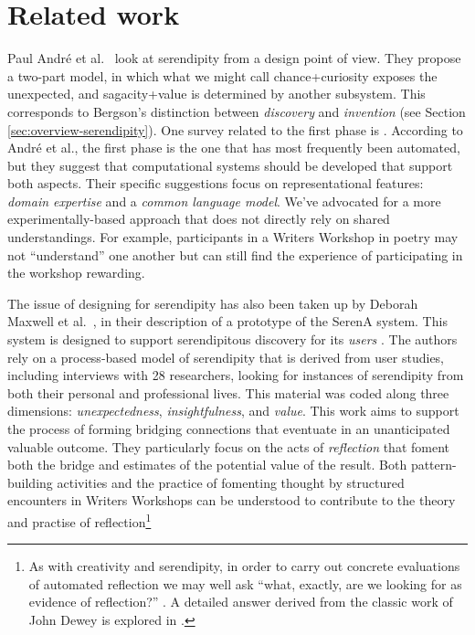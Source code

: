 \section{Related work} \label{sec:related}

Paul Andr{\'e} et al.~\cite{andre2009discovery} look at serendipity
from a design point of view.  They propose a two-part model, in which
what we might call chance+curiosity exposes the unexpected, and
sagacity+value is determined by another subsystem.  This corresponds
to Bergson's distinction between \emph{discovery} and \emph{invention}
(see Section \ref{sec:overview-serendipity}).  One survey related to
the first phase is \cite{foster2003serendipity}.  According to Andr\'e
et al., the first phase is the one that has most frequently been
automated, but they suggest that computational systems should be
developed that support both aspects.  Their specific suggestions focus
on representational features: \emph{domain expertise} and a
\emph{common language model}.  We've advocated for a more
experimentally-based approach that does not directly rely on shared
understandings.  For example, participants in a Writers Workshop in
poetry may not ``understand'' one another but can still find the
experience of participating in the workshop rewarding.

The issue of designing for serendipity has also been taken up by
Deborah Maxwell et al.~\cite{maxwell2012designing}, in their
description of a prototype of the SerenA system.  This system is
designed to support serendipitous discovery for its \emph{users}
\cite{forth2013serena}.  The authors rely on a process-based model of
serendipity \cite{Makri2012,Makri2012a} that is derived from user
studies, including interviews with 28 researchers, looking for
instances of serendipity from both their personal and professional
lives.  This material was coded along three dimensions:
\emph{unexpectedness}, \emph{insightfulness}, and \emph{value}.  This
work aims to support the process of forming bridging connections that
eventuate in an unanticipated valuable outcome.  They particularly
focus on the acts of \emph{reflection} that foment both the bridge and
estimates of the potential value of the result.  Both pattern-building
activities and the practice of fomenting thought by structured
encounters in Writers Workshops can be understood to contribute to the
theory and practise of reflection\footnote{As with creativity and
  serendipity, in order to carry out concrete evaluations of automated
  reflection we may well ask ``what, exactly, are we looking for as
  evidence of reflection?'' \cite{rodgers2002defining}.  A detailed
  answer derived from the classic work of John Dewey
  \cite{dewey1997we} is explored in \cite{rodgers2002defining}.}

